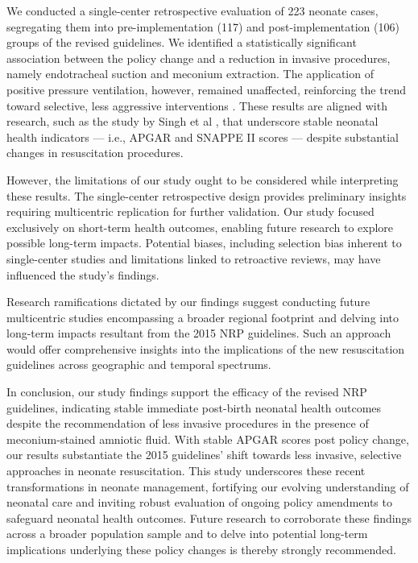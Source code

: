 \documentclass[11pt]{article}
\begin{document}
We conducted a single-center retrospective evaluation of 223 neonate cases, segregating them into pre-implementation (117) and post-implementation (106) groups of the revised guidelines. We identified a statistically significant association between the policy change and a reduction in invasive procedures, namely endotracheal suction and meconium extraction. The application of positive pressure ventilation, however, remained unaffected, reinforcing the trend toward selective, less aggressive interventions \cite{Hoffman2016ImpactOH}. These results are aligned with research, such as the study by Singh et al \cite{Singh2014TheIO}, that underscore stable neonatal health indicators — i.e., APGAR and SNAPPE II scores — despite substantial changes in resuscitation procedures.

However, the limitations of our study ought to be considered while interpreting these results. The single-center retrospective design provides preliminary insights requiring multicentric replication for further validation. Our study focused exclusively on short-term health outcomes, enabling future research to explore possible long-term impacts. Potential biases, including selection bias inherent to single-center studies and limitations linked to retroactive reviews, may have influenced the study's findings.

Research ramifications dictated by our findings suggest conducting future multicentric studies encompassing a broader regional footprint and delving into long-term impacts resultant from the 2015 NRP guidelines. Such an approach would offer comprehensive insights into the implications of the new resuscitation guidelines across geographic and temporal spectrums.

In conclusion, our study findings support the efficacy of the revised NRP guidelines, indicating stable immediate post-birth neonatal health outcomes despite the recommendation of less invasive procedures in the presence of meconium-stained amniotic fluid. With stable APGAR scores post policy change, our results substantiate the 2015 guidelines' shift towards less invasive, selective approaches in neonate resuscitation. This study underscores these recent transformations in neonate management, fortifying our evolving understanding of neonatal care and inviting robust evaluation of ongoing policy amendments to safeguard neonatal health outcomes. Future research to corroborate these findings across a broader population sample and to delve into potential long-term implications underlying these policy changes is thereby strongly recommended.
\end{document}
